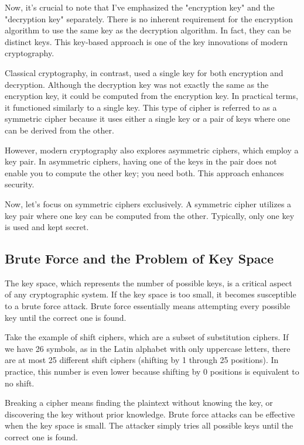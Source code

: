 \documentclass{class}
\begin{document}
Now, it's crucial to note that I've emphasized the "encryption key" and the "decryption key" separately. There is no inherent requirement for the encryption algorithm to use the same key as the decryption algorithm. In fact, they can be distinct keys. This key-based approach is one of the key innovations of modern cryptography.

Classical cryptography, in contrast, used a single key for both encryption and decryption. Although the decryption key was not exactly the same as the encryption key, it could be computed from the encryption key. In practical terms, it functioned similarly to a single key. This type of cipher is referred to as a symmetric cipher because it uses either a single key or a pair of keys where one can be derived from the other.

However, modern cryptography also explores asymmetric ciphers, which employ a key pair. In asymmetric ciphers, having one of the keys in the pair does not enable you to compute the other key; you need both. This approach enhances security.

Now, let's focus on symmetric ciphers exclusively. A symmetric cipher utilizes a key pair where one key can be computed from the other. Typically, only one key is used and kept secret.

\subsection{Brute Force and the Problem of Key Space}

The key space, which represents the number of possible keys, is a critical aspect of any cryptographic system. If the key space is too small, it becomes susceptible to a brute force attack. Brute force essentially means attempting every possible key until the correct one is found.

Take the example of shift ciphers, which are a subset of substitution ciphers. If we have 26 symbols, as in the Latin alphabet with only uppercase letters, there are at most 25 different shift ciphers (shifting by 1 through 25 positions). In practice, this number is even lower because shifting by 0 positions is equivalent to no shift.

Breaking a cipher means finding the plaintext without knowing the key, or discovering the key without prior knowledge. Brute force attacks can be effective when the key space is small. The attacker simply tries all possible keys until the correct one is found.
\end{document}
